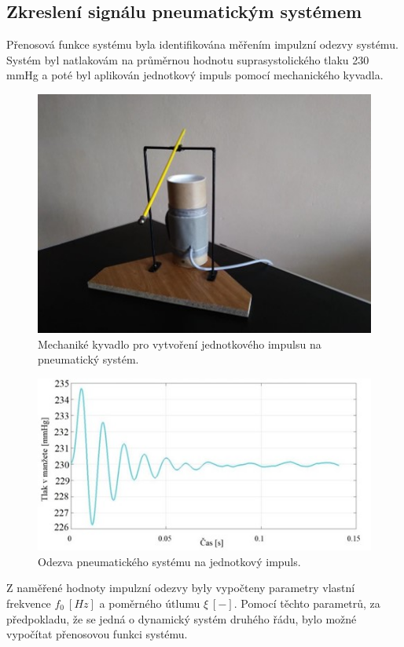 \subsection{Zkreslení signálu pneumatickým systémem}
Přenosová funkce systému byla identifikována měřením impulzní odezvy systému. Systém byl natlakovám na průměrnou hodnotu suprasystolického tlaku 230 mmHg a poté
byl aplikován jednotkový impuls pomocí mechanického kyvadla.
\begin{figure}[H]
    \label{fig:mech_kyvadlo}
    \includegraphics[width=1\textwidth]{pictures/mech_kyvadlo.jpg}
    \caption{Mechaniké kyvadlo pro vytvoření jednotkového impulsu na pneumatický systém.}
\end{figure}
\begin{figure}[H]
    \label{fig:pneu_impulse_response}
    \includegraphics[width=1\textwidth]{pictures/pneu_impulse.jpg}
    \caption{Odezva pneumatického systému na jednotkový impuls.}
\end{figure}
Z naměřené hodnoty impulzní odezvy byly vypočteny parametry vlastní frekvence $f_0 \ [Hz]$ a poměrného útlumu $\xi \ [-]$. Pomocí těchto parametrů, za předpokladu, že se jedná o dynamický systém druhého řádu, bylo možné vypočítat přenosovou funkci systému.
